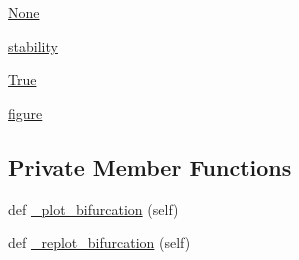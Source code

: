 \begin{DoxyCompactItemize}
\hyperlink{class_mu_mo_t_1_1_mu_mo_tbifurcation_view_ac7485dcc8d256a6f197ed7802687f252}{None}
\item 
\hyperlink{class_mu_mo_t_1_1_mu_mo_tbifurcation_view_a1df8fcdacfec00fc258a3c72772c2f18}{stability}
\item 
\hyperlink{class_mu_mo_t_1_1_mu_mo_tbifurcation_view_a643a20c0c59588a0f741a6095e2025fd}{True}
\item 
\hyperlink{class_mu_mo_t_1_1_mu_mo_tbifurcation_view_a391e34f2de441d79152a7b3d6e4c9c86}{figure}
\end{DoxyCompactItemize}
\subsection*{Private Member Functions}
\begin{DoxyCompactItemize}
\item 
def \hyperlink{class_mu_mo_t_1_1_mu_mo_tbifurcation_view_a385e5f82733060fec5122635ae6a8e67}{\+\_\+plot\+\_\+bifurcation} (self)
\item 
def \hyperlink{class_mu_mo_t_1_1_mu_mo_tbifurcation_view_a13b207330e0a4fe5bb7c3b863bbd0820}{\+\_\+replot\+\_\+bifurcation} (self)
\end{DoxyCompactItemize}
